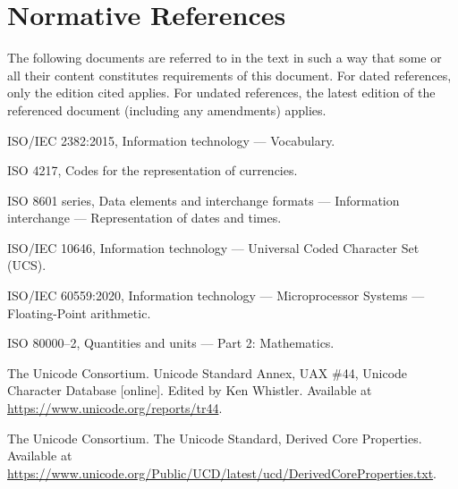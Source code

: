 \section{Normative References}

\pnumauto The following documents are referred to in the text in such a way that some or all their content
constitutes requirements of this document. For dated references, only the edition cited applies.
For undated references, the latest edition of the referenced document (including any amendments)
applies.

\pnumauto ISO/IEC 2382:2015, Information technology — Vocabulary.

\pnumauto ISO 4217, Codes for the representation of currencies.

\pnumauto ISO 8601 series, Data elements and interchange formats — Information interchange — Representation of dates and times.

\pnumauto ISO/IEC 10646, Information technology — Universal Coded Character Set (UCS).

\pnumauto ISO/IEC 60559:2020, Information technology — Microprocessor Systems — Floating-Point arithmetic.

\pnumauto ISO 80000–2, Quantities and units — Part 2: Mathematics.

\pnumauto The Unicode Consortium. Unicode Standard Annex, UAX \#44, Unicode Character Database [online].
Edited by Ken Whistler. Available at \url{https://www.unicode.org/reports/tr44}.

\pnumauto The Unicode Consortium. The Unicode Standard, Derived Core Properties.
Available at \url{https://www.unicode.org/Public/UCD/latest/ucd/DerivedCoreProperties.txt}.
